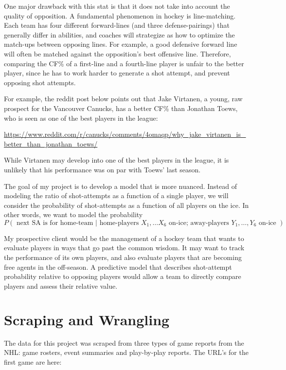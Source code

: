 \documentclass[11pt]{article}
\begin{document}
One major drawback with this stat is that it does not take into account
the quality of opposition. A fundamental phenomenon in hockey is
line-matching. Each team has four different forward-lines (and three
defense-pairings) that generally differ in abilities, and coaches will
strategize as how to optimize the match-ups between opposing lines. For
example, a good defensive forward line will often be matched against the
opposition's best offensive line. Therefore, comparing the CF\% of a
first-line and a fourth-line player is unfair to the better player,
since he has to work harder to generate a shot attempt, and prevent
opposing shot attempts.

For example, the reddit post below points out that Jake Virtanen, a young,
raw prospect for the Vancouver Canucks, has a better CF\% than Jonathan
Toews, who is seen as one of the best players in the league:

\url{https://www.reddit.com/r/canucks/comments/4omaqp/why\_jake\_virtanen\_is\_better\_than\_jonathan\_toews/}

\noindent While Virtanen may develop into one of the best players in the league,
it is unlikely that his performance was on par with Toews' last season.

The goal of my project is to develop a model that is more nuanced.
Instead of modeling the ratio of shot-attempts as a function of a single
player, we will consider the probability of shot-attempts as a function
of all players on the ice. In other words, we want to model the
probability
\
\[P(\textrm{ next SA is for home-team } | \textrm{ home-players } X_1, … X_6 \textrm{ on-ice; away-players } Y_1, …, Y_6 \textrm{ on-ice } )\]

My prospective client would be the management of a hockey team that
wants to evaluate players in ways that go past the common wisdom. It may
want to track the performance of its own players, and also evaluate
players that are becoming free agents in the off-season. A predictive
model that describes shot-attempt probability relative to opposing
players would allow a team to directly compare players and assess their
relative value.

    \section{Scraping and Wrangling}\label{scraping-and-wrangling}

The data for this project was scraped from three types of game reports from the NHL: game
rosters, event summaries and play-by-play reports. The URL's for the
first game are here:
\end{document}
